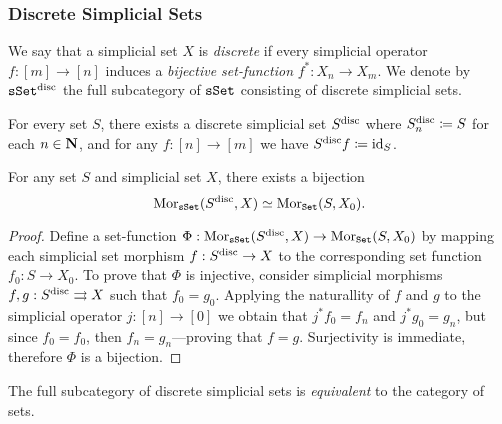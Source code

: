 \subsubsection{Discrete Simplicial Sets}

\begin{definition}
    \label{def:discrete-simplicial-set}
    We say that a simplicial set \(X\) is \emph{discrete} if every simplicial
    operator \(f: [m] \to [n]\) induces a \emph{bijective set-function}
    \(f^{*}: X_n \to X_m\). We denote by \(\sSet^{\disc}\) the full subcategory of
    \({\texttt{sSet}}\) consisting of discrete simplicial sets.

    For every set \(S\), there exists a discrete simplicial set \(S^{\text{disc}}\) where
    \(S_n^{\text{disc}} \coloneq S\) for each \(n \in \mathbf{N}\), and for any \(f: [n] \to [m]\)
    we have \(S^{\text{disc}} f \coloneq \operatorname{id}_S\).
\end{definition}

\begin{corollary}
    \label{cor:bijection-discrete-simplicial-set-and-set-functions}
    For any set \(S\) and simplicial set \(X\), there exists a bijection
    \[
        \operatorname{Mor}_{{\texttt{sSet}}}(S^{\text{disc}}, X) \simeq \operatorname{Mor}_{{\texttt{Set}}}(S, X_0).
    \]
\end{corollary}

\begin{proof}
    Define a set-function
    \(\Phi: \operatorname{Mor}_{{\texttt{sSet}}}(S^{\text{disc}}, X) \to \operatorname{Mor}_{{\texttt{Set}}}(S, X_0)\) by mapping each
    simplicial set morphism \(f: S^{\text{disc}} \to X\) to the corresponding set function
    \(f_0: S \to X_0\). To prove that \(\Phi\) is injective, consider simplicial
    morphisms \(f, g: S^{\text{disc}} \rightrightarrows X\) such that \(f_0 = g_0\). Applying the
    naturallity of \(f\) and \(g\) to the simplicial operator \(j: [n] \to [0]\) we
    obtain that \(j^{*} f_0 = f_n\) and \(j^{*} g_0 = g_n\), but since
    \(f_0 = f_0\), then \(f_n = g_n\)---proving that \(f = g\). Surjectivity is
    immediate, therefore \(\Phi\) is a bijection.
\end{proof}

\begin{proposition}[\(\sSet^{\disc}\) \& \(\Set\)]
    \label{prop:sSet-disc-equivalent-to-Set}
    The full subcategory of discrete simplicial sets is \emph{equivalent} to the
    category of sets.
\end{proposition}

